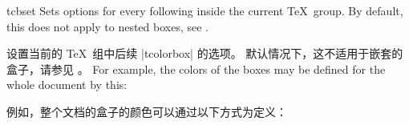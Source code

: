 \begin{docCommand}{tcbset}{}
Sets options for every following  inside the current \TeX\ group.
By default, this does not apply to nested boxes, see .

设置当前的 \TeX\ 组中后续 |tcolorbox| 的选项。 默认情况下，这不适用于嵌套的盒子，请参见 。\parpar
For example, the colors of the boxes may be defined for the whole document by this:


例如，整个文档的盒子的颜色可以通过以下方式为定义：
  
\begin{dispListing}
\end{dispListing}
\end{docCommand}